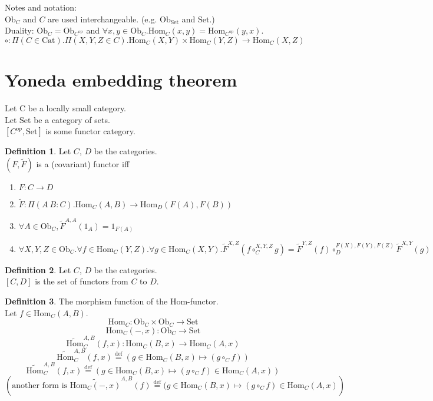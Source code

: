 \documentclass[10pt,a4paper]{article}
\theoremstyle{definition}
\newtheorem{definition}{Definition}[section]
\newcommand{\Ob}{{\mbox{Ob}}}
\newcommand{\Cat}{{\mbox{Cat}}}
\newcommand{\Hom}{{\mbox{Hom}}}
\newcommand{\HomMor}{{\widetilde{\Hom}\mbox{}}}
\newcommand{\FMor}{{\widetilde{F}\mbox{}}}
\newcommand{\op}{{\mbox{op}}}
\newcommand{\defi}{{\mbox{def}}}
\newcommand{\eqdef}{{\stackrel{\defi}{=}}}
\newcommand{\Set}{{\mbox{Set}}}
\newcommand{\ra}{{\rightarrow}}
\begin{document}
Notes and notation:\\
$\Ob_C$ and $C$ are used interchangeable. (e.g. $\Ob_\Set$ and $\Set$.)\\
Duality: $\Ob_C = \Ob_{C^\op}$ and 
 $\forall x,y \in \Ob_C. \Hom_C(x,y) = \Hom_{C^\op}(y,x)$.\\
$\circ : \Pi(C\in \Cat).\Pi(X,Y,Z\in C).\Hom_C(X,Y)\times\Hom_C(Y,Z)\to\Hom_C(X,Z)$

\section{Yoneda embedding theorem}
Let C be a locally small category.\\
Let Set be a category of sets.\\
$[C^{op},\mbox{Set}]$ is some functor category.\\

\begin{definition}
Let $C$, $D$ be the categories.\\
 $(F, \FMor)$ is a (covariant) functor iff\\
\begin{enumerate}
\item $F:C \ra D$
\item $\FMor:\Pi(A\ B:C).\Hom_C(A,B) \ra \Hom_D(F(A), F(B))$
\item $\forall A\in \Ob_C, \FMor^{A,A}(1_A)=1_{F(A)}$
\item $\forall X,Y,Z \in \Ob_C.\forall f\in\Hom_C(Y,Z).\forall g\in\Hom_C(X,Y). \FMor^{X,Z}(f\circ_C^{X,Y,Z} g)=\FMor^{Y,Z}(f)\circ_D^{F(X),F(Y),F(Z)} \FMor^{X,Y}(g)$
\end{enumerate}

\end{definition}

\begin{definition}
Let $C$, $D$ be the categories.\\
$[C,D]$ is the set of functors from $C$ to $D$.\\
\end{definition}

\begin{definition} The morphism function of the Hom-functor.\\
Let $f\in\Hom_{C}(A,B)$.
$$\Hom_C: \Ob_C \times \Ob_C \to \Set$$
$$\Hom_C(-,x): \Ob_C \to \Set$$
$$\HomMor^{A,B}_C(f,x) : \Hom_C(B,x) \to \Hom_C(A,x)$$
$$\HomMor^{A,B}_C(f,x) \eqdef (g \in\Hom_C(B,x) \mapsto (g \circ_C f))$$
$$\HomMor^{A,B}_C(f,x) \eqdef (g \in\Hom_C(B,x) \mapsto (g \circ_C f) \in\Hom_C(A,x))$$
$$\left(\mbox{another form is }\widetilde{\Hom_C(-,x)}^{A,B}(f) \eqdef (g \in\Hom_C(B,x) \mapsto (g \circ_C f) \in\Hom_C(A,x)\right)$$
\end{definition}
\end{document}
